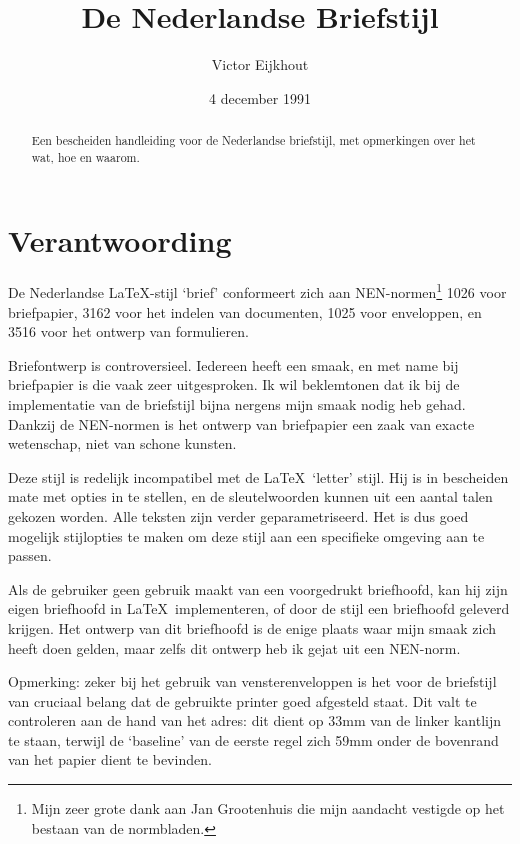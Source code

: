 \documentclass[a4paper,10pt]{artikel1}
\begin{document}
\title{De Nederlandse Briefstijl}
\author{Victor Eijkhout}
\date{4 december 1991}
\maketitle
 
\begin{abstract}
  Een bescheiden handleiding voor de Nederlandse briefstijl, met
  opmerkingen over het wat, hoe en waarom.
\end{abstract}
 
\section{Verantwoording}
 
De Nederlandse \LaTeX-stijl `brief' conformeert zich aan
NEN-normen\footnote{Mijn zeer grote dank aan Jan Grootenhuis die mijn
  aandacht vestigde op het bestaan van de normbladen.} 1026 voor
briefpapier, 3162 voor het indelen van documenten, 1025 voor
enveloppen, en 3516 voor het ontwerp van formulieren.
 
Briefontwerp is controversieel. Iedereen heeft een smaak, en met name
bij briefpapier is die vaak zeer uitgesproken.  Ik wil beklemtonen dat
ik bij de implementatie van de briefstijl bijna nergens mijn smaak
nodig heb gehad. Dankzij de NEN-normen is het ontwerp van briefpapier
een zaak van exacte wetenschap, niet van schone kunsten.
 
Deze stijl is redelijk incompatibel met de \LaTeX\ `letter' stijl.
Hij is in bescheiden mate met opties in te stellen, en de
sleutelwoorden kunnen uit een aantal talen gekozen worden. Alle
teksten zijn verder geparametriseerd.  Het is dus goed mogelijk
stijlopties te maken om deze stijl aan een specifieke omgeving aan te
passen.
 
Als de gebruiker geen gebruik maakt van een voorgedrukt briefhoofd,
kan hij zijn eigen briefhoofd in \LaTeX\ implementeren, of door de
stijl een briefhoofd geleverd krijgen. Het ontwerp van dit briefhoofd
is de enige plaats waar mijn smaak zich heeft doen gelden, maar zelfs
dit ontwerp heb ik gejat uit een NEN-norm.
 
Opmerking: zeker bij het gebruik van vensterenveloppen is het voor de
briefstijl van cruciaal belang dat de gebruikte printer goed afgesteld
staat. Dit valt te controleren aan de hand van het adres: dit dient op
33mm van de linker kantlijn te staan, terwijl de `baseline' van de
eerste regel zich 59mm onder de bovenrand van het papier dient te
bevinden.
 
\end{document}
